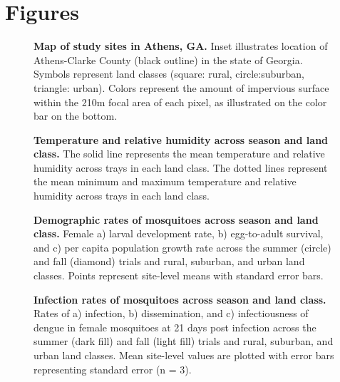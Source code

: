 \documentclass[12pt]{article}
\begin{document}
\newpage


\newpage

\section*{Figures}

\begin{figure}[h!]
  \caption{\textbf{Map of study sites in Athens, GA.}
      Inset illustrates location of Athens-Clarke County (black outline) in the state of Georgia. Symbols represent land classes (square: rural, circle:suburban, triangle: urban). Colors represent the amount of impervious surface within the 210m focal area of each pixel, as illustrated on the color bar on the bottom.}
   \label{Fig:map}
\end{figure}

\begin{figure}[h!]
  \caption{\textbf{Temperature and relative humidity across season and land class.}
      The solid line represents the mean temperature and relative humidity across trays in each land class. The dotted lines represent the mean minimum and maximum temperature and relative humidity across trays in each land class.}
        \label{Fig:climate}
\end{figure}

\begin{figure}[h!]
  \caption{\textbf{Demographic rates of mosquitoes across season and land class.}
      Female a) larval development rate, b) egg-to-adult survival, and c) per capita population growth rate across the summer (circle) and fall (diamond) trials and rural, suburban, and urban land classes. Points represent site-level means with standard error bars.}
    \label{Fig:demographic}
\end{figure}

\begin{figure}[h!]
  \caption{\textbf{Infection rates of mosquitoes across season and land class.}
      Rates of a) infection, b) dissemination, and c) infectiousness of dengue in female mosquitoes at 21 days post infection across the summer (dark fill) and fall (light fill) trials and rural, suburban, and urban land classes. Mean site-level values are plotted with error bars representing standard error (n = 3).}
        \label{Fig:infection}
\end{figure}
\end{document}

